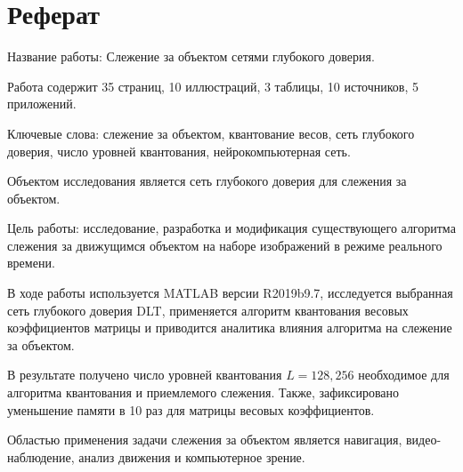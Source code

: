 \section*{Реферат}

\pagestyle{empty}
Название работы: Слежение за объектом сетями глубокого доверия.

Работа содержит 35 страниц, 10 иллюстраций, 3 таблицы, 10 источников, 5 приложений.

Ключевые слова: слежение за объектом, квантование весов, сеть глубокого доверия, число уровней квантования, нейрокомпьютерная сеть.

Объектом исследования является сеть глубокого доверия для слежения за объектом. 

Цель работы: исследование, разработка и модификация существующего алгоритма слежения за движущимся объектом на наборе изображений в режиме реального времени.

В ходе работы используется MATLAB версии R2019b9.7, исследуется выбранная сеть глубокого доверия DLT, применяется алгоритм квантования весовых коэффициентов матрицы и приводится аналитика влияния алгоритма на слежение за объектом. 

В результате получено число уровней квантования $L=128, 256$ необходимое для алгоритма квантования и приемлемого слежения. Также, зафиксировано уменьшение памяти в 10 раз для матрицы весовых коэффициентов.

Областью применения задачи слежения за объектом является навигация, видео-наблюдение, анализ движения и компьютерное зрение.
